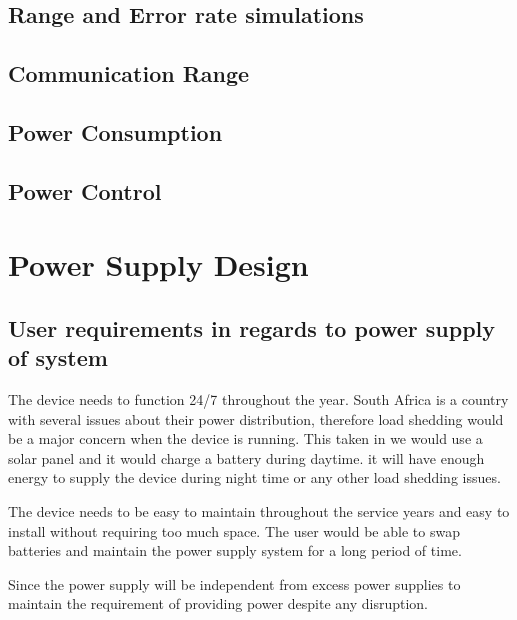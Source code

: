 \documentclass[12pt]{article}
\begin{document}
\subsection{Range and Error rate simulations}

\subsection{Communication Range}

\subsection{Power Consumption}

\subsection{Power Control}

\section{Power Supply Design}
\subsection{User requirements in regards to power supply of system}
The device needs to function 24/7 throughout the year. South Africa is a country with several issues about their power distribution, therefore load shedding would be a major concern when the device is running. This taken in we would use a solar panel and it would charge a battery during daytime. it will have enough energy to supply the device during night time or any other load shedding issues.

The device needs to be easy to maintain throughout the service years and easy to install without requiring too much space. The user would be able to swap batteries and maintain the power supply system for a long period of time.

Since the power supply will be independent from  excess power supplies to maintain the requirement of providing power despite any disruption.
\end{document}
